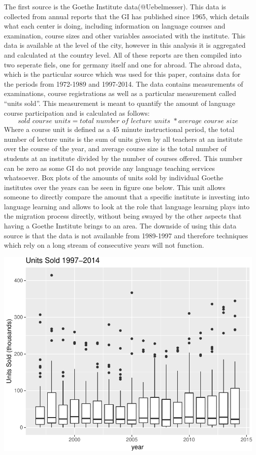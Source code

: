 \documentclass[]{article}
\begin{document}
The first source is the Goethe Institute data(@Uebelmesser). This data
is collected from annual reports that the GI has published since 1965,
which details what each center is doing, including information on
language courses and examination, course sizes and other variables
associated with the institute. This data is available at the level of
the city, however in this analysis it is aggregated and calculated at
the country level. All of these reports are then compiled into two
seperate fiels, one for germany itself and one for abroad. The abroad
data, which is the particular source which was used for this paper,
contains data for the periods from 1972-1989 and 1997-2014. The data
contains measurements of examinations, course registrations as well as a
particular measurement called ``units sold''. This measurement is meant
to quantify the amount of language course participation and is
calculated as
follows:\[\textit{sold course units} = \textit{total number of lecture units } * \textit{average course size}\]
Where a course unit is defined as a 45 minute instructional period, the
total number of lecture units is the sum of units given by all teachers
at an institute over the course of the year, and average course size is
the total number of students at an institute divided by the number of
courses offered. This number can be zero as some GI do not provide any
language teaching services whatsoever. Box plots of the amounts of units
sold by individual Goethe institutes over the years can be seen in
figure one below. This unit allows someone to directly compare the
amount that a specific institute is investing into language learning and
allows to look at the role that language learning plays into the
migration process directly, without being swayed by the other aspects
that having a Goethe Institute brings to an area. The downside of using
this data source is that the data is not availanble from 1989-1997 and
therefore techniques which rely on a long stream of consecutive years
will not function.

\begin{center}\includegraphics{Cultural_Exchange_and_Outbound_Migration_files/figure-latex/figl-1} \end{center}
\end{document}
